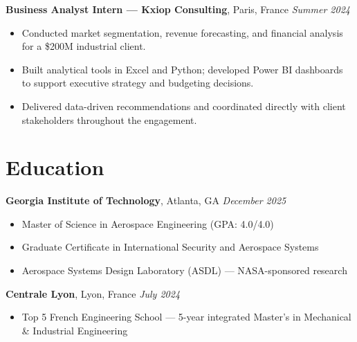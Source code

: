 \documentclass[a4paper,10pt]{article}
\begin{document}
\vspace{6pt}

\textbf{Business Analyst Intern — Kxiop Consulting}, Paris, France \hfill \textit{Summer 2024} \\[3.75pt]
\begin{minipage}[t]{\linewidth}
\begin{itemize}[nosep,after=\strut, leftmargin=1em, itemsep=3pt,label=--]
    \item Conducted market segmentation, revenue forecasting, and financial analysis for a \$200M industrial client.
    \item Built analytical tools in Excel and Python; developed Power BI dashboards to support executive strategy and budgeting decisions.
    \item Delivered data-driven recommendations and coordinated directly with client stakeholders throughout the engagement.
\end{itemize}
\end{minipage}

\section*{Education}

\textbf{Georgia Institute of Technology}, Atlanta, GA \hfill \textit{December 2025}
\begin{itemize}[nosep,after=\strut, leftmargin=1em, itemsep=2pt,label=--]
    \item Master of Science in Aerospace Engineering (GPA: 4.0/4.0)
    \item Graduate Certificate in International Security and Aerospace Systems
    \item Aerospace Systems Design Laboratory (ASDL) — NASA-sponsored research
\end{itemize}

\vspace{2pt}

\textbf{Centrale Lyon}, Lyon, France \hfill \textit{July 2024}
\begin{itemize}[nosep,after=\strut, leftmargin=1em, itemsep=2pt,label=--]
    \item Top 5 French Engineering School — 5-year integrated Master's in Mechanical \& Industrial Engineering
\end{itemize}
\end{document}
